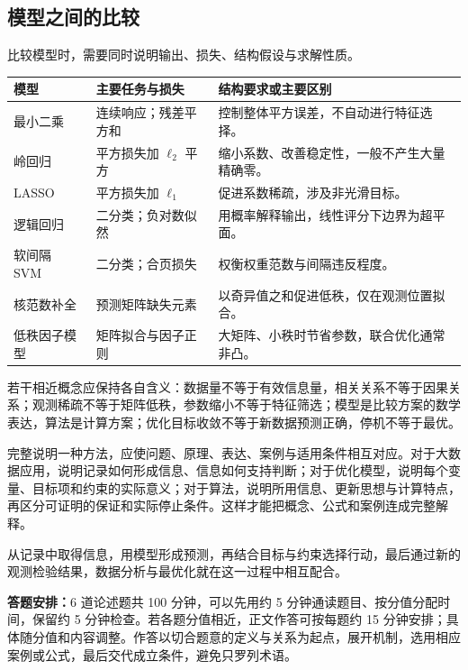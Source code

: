 \documentclass[UTF8,fontset=fandol,a4paper,12pt]{ctexart}
\theoremstyle{definition}
\begin{document}
\subsection{模型之间的比较}
比较模型时，需要同时说明输出、损失、结构假设与求解性质。
\begin{center}
\small
\begin{tabular}{p{}p{}p{}}
\toprule
模型 & 主要任务与损失 & 结构要求或主要区别\\
\midrule
最小二乘 & 连续响应；残差平方和 & 控制整体平方误差，不自动进行特征选择。\\
岭回归 & 平方损失加 $\ell_2$ 平方 & 缩小系数、改善稳定性，一般不产生大量精确零。\\
LASSO & 平方损失加 $\ell_1$ & 促进系数稀疏，涉及非光滑目标。\\
逻辑回归 & 二分类；负对数似然 & 用概率解释输出，线性评分下边界为超平面。\\
软间隔 SVM & 二分类；合页损失 & 权衡权重范数与间隔违反程度。\\
核范数补全 & 预测矩阵缺失元素 & 以奇异值之和促进低秩，仅在观测位置拟合。\\
低秩因子模型 & 矩阵拟合与因子正则 & 大矩阵、小秩时节省参数，联合优化通常非凸。\\
\bottomrule
\end{tabular}
\end{center}

若干相近概念应保持各自含义：数据量不等于有效信息量，相关关系不等于因果关系；观测稀疏不等于矩阵低秩，参数缩小不等于特征筛选；模型是比较方案的数学表达，算法是计算方案；优化目标收敛不等于新数据预测正确，停机不等于最优。

完整说明一种方法，应使问题、原理、表达、案例与适用条件相互对应。对于大数据应用，说明记录如何形成信息、信息如何支持判断；对于优化模型，说明每个变量、目标项和约束的实际意义；对于算法，说明所用信息、更新思想与计算特点，再区分可证明的保证和实际停止条件。这样才能把概念、公式和案例连成完整解释。

从记录中取得信息，用模型形成预测，再结合目标与约束选择行动，最后通过新的观测检验结果，数据分析与最优化就在这一过程中相互配合。

\smallskip
\noindent\textbf{答题安排：}6 道论述题共 100 分钟，可以先用约 5 分钟通读题目、按分值分配时间，保留约 5 分钟检查。若各题分值相近，正文作答可按每题约 15 分钟安排；具体随分值和内容调整。作答以切合题意的定义与关系为起点，展开机制，选用相应案例或公式，最后交代成立条件，避免只罗列术语。

\clearpage
\appendix
\end{document}
